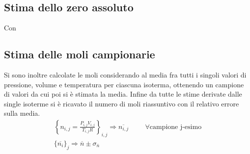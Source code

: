 \documentclass[a4paper,11pt,oneside]{article}
\begin{document}

\subsection{Stima dello zero assoluto}
Con 



\subsection{Stima delle moli campionarie}
Si sono inoltre calcolate le moli considerando al media fra tutti i singoli valori di pressione, volume e temperatura per ciascuna isoterma, ottenendo un campione di valori da cui poi si è stimata la media. Infine da tutte le stime derivate dalle single isoterme si è ricavato il numero di moli riassuntivo con il relativo errore sulla media.
\begin{gather*}
    \left \{n_{i, j}=\frac{P_{i, j}V_{i, j}}{T_{i, j}R}\right \}_{i, j} \Rightarrow \overline{n_{i, j}} \hspace{1cm}\forall \text{campione j-esimo}\\
    \{\overline{n_{i}}\}_{j} \Rightarrow \overline{n}\pm \sigma_{\overline{n}}
\end{gather*}
\end{document}
